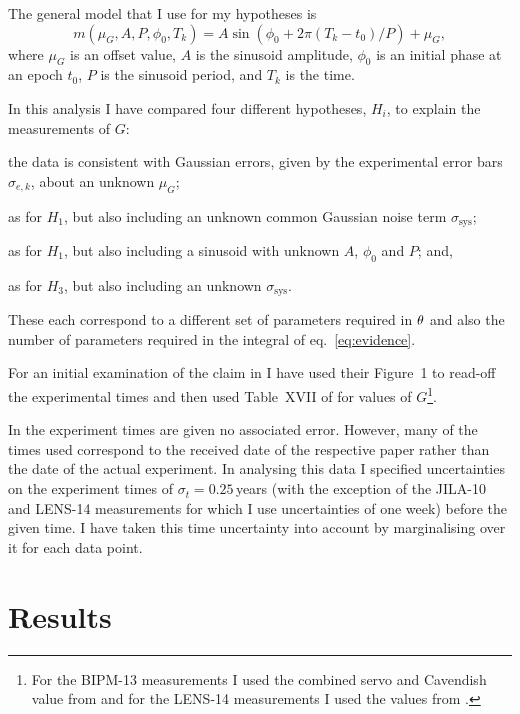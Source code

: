 \documentclass[comment]{epl2}
\begin{document}
The general model that I use for my hypotheses is
\begin{equation}\label{eq:model}
 m(\mu_G, A, P, \phi_0, T_k) = A\sin{(\phi_0 + 2\pi (T_k-t_0)/P)} + \mu_G,
\end{equation}
where $\mu_G$ is an offset value, $A$ is the sinusoid amplitude, $\phi_0$ is an initial phase at an epoch $t_0$,
$P$ is the sinusoid period, and $T_k$ is the time.

In this analysis I have compared four different hypotheses, $H_i$, to explain the measurements of $G$:
\begin{enumerate*}[label=$H_{\arabic*}$\upshape)]
 \item the data is consistent with Gaussian errors, given by the experimental error bars $\sigma_{e,k}$, about an 
 unknown $\mu_G$;
 \item as for $H_1$, but also including an unknown common Gaussian noise term $\sigma_{\mathrm{sys}}$;
 \item as for $H_1$, but also including a sinusoid with unknown $A$, $\phi_0$ and $P$; and, 
 \item as for $H_3$, but also including an unknown $\sigma_{\mathrm{sys}}$.
\end{enumerate*}
These each correspond to a different set of parameters required in $\mathbf{\theta}$ and also the number of
parameters required in the integral of eq.~\ref{eq:evidence}.

For an initial examination of the claim in \cite{2015EL....11010002A} I have used their Figure~1 to read-off
the experimental times and then used Table~XVII of \cite{RevModPhys.84.1527} for values of $G$\footnote{For
the BIPM-13 measurements I used the combined servo and Cavendish value from \cite{PhysRevLett.113.039901}
and for the LENS-14 measurements I used the values from \cite{2014Natur.510..518R}.}.

In \cite{2015EL....11010002A} the experiment times are given no associated error.
However, many of the times used correspond to the received date of the respective paper rather than the
date of the actual experiment.  In analysing this data I specified uncertainties on the experiment times of
$\sigma_{t} = 0.25$\,years (with the exception of the JILA-10 and LENS-14 measurements for which I use uncertainties
of one week) before the given time. I have taken this time uncertainty into account by marginalising over
it for each data point.

\section{Results}
\end{document}
